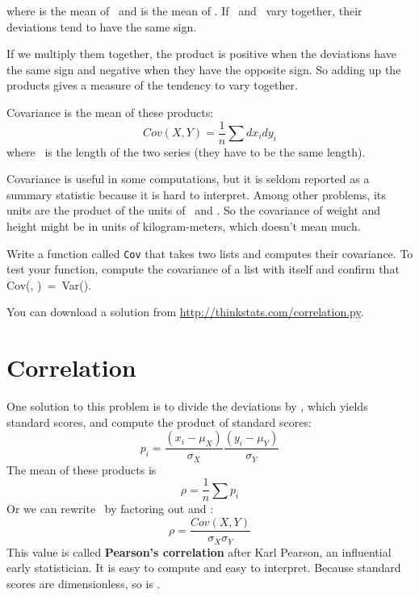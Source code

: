 \documentclass[12pt]{book}
\begin{document}


where \mymu {} is the mean of \X~and \mymu {} is the mean of \Y.
If \X~and \Y~vary together, their deviations tend to have the same
sign.

If we multiply them together, the product is positive when the
deviations have the same sign and negative when they have the opposite
sign.  So adding up the products gives a measure of the tendency to
vary together.

Covariance is the mean of these products:
%
\[ Cov(X,Y) = \frac{1}{n} \sum dx_i dy_i \]
%
where \n~is the length of the two series (they have to be the same
length).

Covariance is useful in some computations, but
it is seldom reported as a summary statistic because it is hard to
interpret.  Among other problems, its units are the product of the
units of \X~and \Y.  So the covariance of weight and height might be
in units of kilogram-meters, which doesn't mean much.

\begin{exercise}
Write a function called {\tt Cov} that takes two lists
and computes their covariance.  To test your function, compute
the covariance of a list with itself and confirm that
Cov(\X, \X)~=~Var(\X).

You can download a solution from
\url{http://thinkstats.com/correlation.py}.

\end{exercise}


\section{Correlation}

One solution to this problem is to divide the deviations by \mysigma,
which yields standard scores, and compute the product of standard scores:
%
\[ p_i = \frac{(x_i - \mu_X)}{\sigma_X} \frac{(y_i - \mu_Y)}{\sigma_Y} \]
%
The mean of these products is
%
\[ \rho = \frac{1}{n} \sum p_i \]
%
Or we can rewrite \myrho~by factoring out \mysigma {} and
\mysigma {}:
%
\[ \rho = \frac{Cov(X,Y)}{\sigma_X \sigma_Y} \]
%
This value is called {\bf Pearson's correlation} after Karl Pearson,
an influential early statistician.  It is easy to compute and easy to
interpret.  Because standard scores are dimensionless, so is \myrho.
\end{document}
